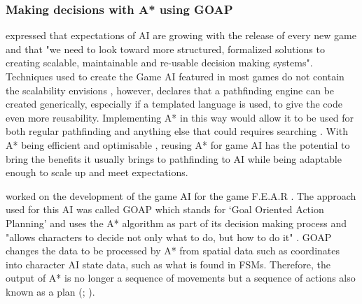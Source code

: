 \documentclass[11pt, a4paper]{article}
\begin{document}
\subsubsection{Making decisions with A* using GOAP}
\label{subsubsec:makingDecisionsWithAStarUsingGOAP}

\citeauthor{orkin2003applying} \parencite*[11]{orkin2003applying} expressed that expectations of AI are growing with the release of every new game and that "we need to look toward more structured, formalized solutions to creating scalable, maintainable and re-usable decision making systems". Techniques used to create the Game AI featured in most games do not contain the scalability \citeauthor{orkin2003applying} envisions \parencite[17]{laird2001human}, however, \citeauthor{higgins2002generic} \parencite*[117]{higgins2002generic} declares that a pathfinding engine can be created generically, especially if a templated language is used, to give the code even more reusability. Implementing A* in this way would allow it to be used for both regular pathfinding and anything else that could requires searching \parencite[120]{higgins2002generic}. With A* being efficient and optimisable \parencite[215]{millington2019ai}, reusing A* for game AI has the potential to bring the benefits it usually brings to pathfinding to AI while being adaptable enough to scale up and meet expectations.

\citeauthor{orkin2006three} \parencite*[1]{orkin2006three} worked on the development of the game AI for the game F.E.A.R \parencite{FEAR}. The approach used for this AI was called GOAP which stands for `Goal Oriented Action Planning' and uses the A* algorithm as part of its decision making process and "allows characters to decide not only what to do, but how to do it" \parencite[1]{orkin2003applying}. GOAP changes the data to be processed by A* from spatial data such as coordinates into character AI state data, such as what is found in FSMs. Therefore, the output of A* is no longer a sequence of movements but a sequence of actions also known as a plan (\cite[2]{orkin2003applying}; \cite[6]{tozour2002evolution}).
\end{document}
